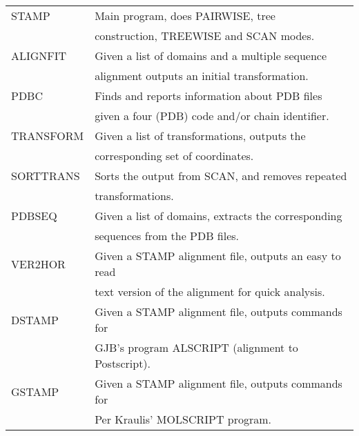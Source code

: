 \begin{center}
\begin{tabular}{|ll|}
\hline
STAMP   &   Main program, does PAIRWISE, tree \\
        &   construction, TREEWISE and SCAN modes.\\
\hline
ALIGNFIT &   Given a list of domains and a multiple sequence \\   
        &      alignment outputs an initial transformation.\\
\hline
PDBC    &    Finds and reports information about PDB files\\
        &     given a four (PDB) code and/or chain identifier.\\ 
\hline
TRANSFORM  & Given a list of transformations, outputs the\\ 
            & corresponding set of coordinates.\\
\hline
SORTTRANS & Sorts the output from SCAN, and removes repeated \\ 
          &   transformations. \\
\hline
PDBSEQ   & Given a list of domains, extracts the corresponding \\
         &    sequences from the PDB files.\\
\hline
VER2HOR  & Given a STAMP alignment file, outputs an easy to read\\
         &    text version of the alignment for quick analysis.\\
\hline
DSTAMP   & Given a STAMP alignment file, outputs commands for\\
         &    GJB's program ALSCRIPT (alignment to Postscript).\\
\hline
GSTAMP   & Given a STAMP alignment file, outputs commands for\\
         &    Per Kraulis' MOLSCRIPT program.\\
\hline
\end{tabular}
\end{center}


